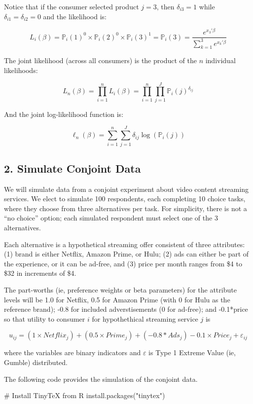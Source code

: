 \documentclass[
  letterpaper,
  DIV=11,
  numbers=noendperiod]{scrartcl}
\newenvironment{Shaded}{\begin{snugshade}}{\end{snugshade}}
\newcommand{\CommentTok}[1]{\textcolor[rgb]{0.37,0.37,0.37}{#1}}
\newcommand{\FunctionTok}[1]{\textcolor[rgb]{0.28,0.35,0.67}{#1}}
\newcommand{\NormalTok}[1]{\textcolor[rgb]{0.00,0.23,0.31}{#1}}
\newcommand{\StringTok}[1]{\textcolor[rgb]{0.13,0.47,0.30}{#1}}
\begin{document}
Notice that if the consumer selected product \(j=3\), then
\(\delta_{i3}=1\) while \(\delta_{i1}=\delta_{i2}=0\) and the likelihood
is:

\[ L_i(\beta) = \mathbb{P}_i(1)^0 \times \mathbb{P}_i(2)^0 \times \mathbb{P}_i(3)^1 = \mathbb{P}_i(3) = \frac{e^{x_3'\beta}}{\sum_{k=1}^3e^{x_k'\beta}} \]

The joint likelihood (across all consumers) is the product of the \(n\)
individual likelihoods:

\[ L_n(\beta) = \prod_{i=1}^n L_i(\beta) = \prod_{i=1}^n \prod_{j=1}^J \mathbb{P}_i(j)^{\delta_{ij}} \]

And the joint log-likelihood function is:

\[ \ell_n(\beta) = \sum_{i=1}^n \sum_{j=1}^J \delta_{ij} \log(\mathbb{P}_i(j)) \]

\subsection{2. Simulate Conjoint Data}\label{simulate-conjoint-data}

We will simulate data from a conjoint experiment about video content
streaming services. We elect to simulate 100 respondents, each
completing 10 choice tasks, where they choose from three alternatives
per task. For simplicity, there is not a ``no choice'' option; each
simulated respondent must select one of the 3 alternatives.

Each alternative is a hypothetical streaming offer consistent of three
attributes: (1) brand is either Netflix, Amazon Prime, or Hulu; (2) ads
can either be part of the experience, or it can be ad-free, and (3)
price per month ranges from \$4 to \$32 in increments of \$4.

The part-worths (ie, preference weights or beta parameters) for the
attribute levels will be 1.0 for Netflix, 0.5 for Amazon Prime (with 0
for Hulu as the reference brand); -0.8 for included adverstisements (0
for ad-free); and -0.1*price so that utility to consumer \(i\) for
hypothethical streaming service \(j\) is

\[
u_{ij} = (1 \times Netflix_j) + (0.5 \times Prime_j) + (-0.8*Ads_j) - 0.1\times Price_j + \varepsilon_{ij}
\]

where the variables are binary indicators and \(\varepsilon\) is Type 1
Extreme Value (ie, Gumble) distributed.

The following code provides the simulation of the conjoint data.

\begin{Shaded}
\begin{Highlighting}[]
\CommentTok{\# Install TinyTeX from R}
\FunctionTok{install.packages}\NormalTok{(}\StringTok{"tinytex"}\NormalTok{)}
\end{Highlighting}
\end{Shaded}
\end{document}
